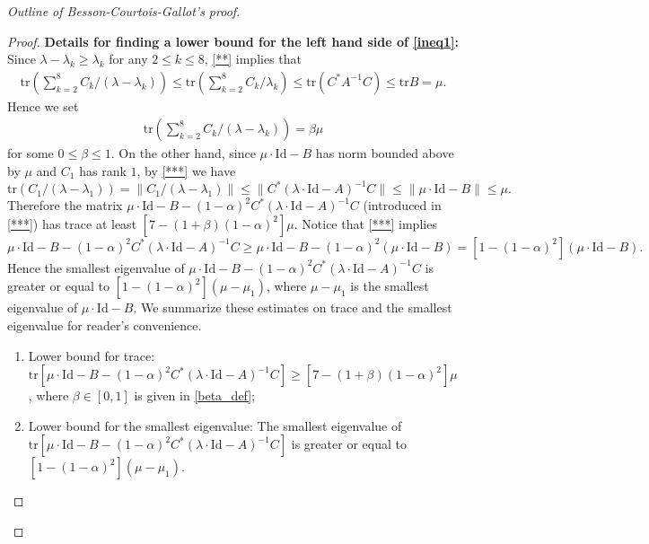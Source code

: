 \documentclass{article}
\newcommand{\id}{\mathrm{Id}}
\newcommand{\tr}{\mathrm{tr}}
\theoremstyle{definition}
\begin{document}
\begin{proof}[Outline of Besson-Courtois-Gallot's proof]
\begin{proof}
\textbf{Details for finding a lower bound for the left hand side of \eqref{ineq1}:} Since $\lambda-\lambda_k\geq\lambda_k$ for any $2\leq k\leq 8$, \eqref{**} implies that 
\begin{align}\label{case2_trace_ineq}
\tr\left(\sum_{k=2}^8C_k/(\lambda-\lambda_k)\right)\leq \tr\left(\sum_{k=2}^8C_k/\lambda_k\right)\leq \tr(C^*A^{-1}C)\leq \tr B=\mu.
\end{align}
Hence we set 
\begin{align}\label{beta_def}
\tr\left(\sum_{k=2}^8C_k/(\lambda-\lambda_k)\right)=\beta\mu
\end{align}
for some $0\leq\beta\leq 1$. On the other hand, since $\mu\cdot\id-B$ has norm bounded above by $\mu$ and $C_1$ has rank $1$, by \eqref{***} we have
$$\tr(C_1/(\lambda-\lambda_1))=\|C_1/(\lambda-\lambda_1)\|\leq\|C^*(\lambda\cdot\id-A)^{-1}C\|\leq\|\mu\cdot\id-B\|\leq \mu.$$
Therefore the matrix $\mu\cdot\id-B-(1-\alpha)^2C^*(\lambda\cdot\id-A)^{-1}C$ (introduced in \eqref{***}) has trace at least $[7-(1+\beta)(1-\alpha)^2]\mu$.
Notice that \eqref{***} implies
$$\mu\cdot\id-B-(1-\alpha)^2C^*(\lambda\cdot\id-A)^{-1}C\geq\mu\cdot\id-B-(1-\alpha)^2(\mu\cdot\id-B)=[1-(1-\alpha)^2](\mu\cdot\id-B).$$
Hence the smallest eigenvalue of $\mu\cdot\id-B-(1-\alpha)^2C^*(\lambda\cdot\id-A)^{-1}C$ is greater or equal to $[1-(1-\alpha)^2](\mu-\mu_1)$, where $\mu-\mu_1$ is the smallest eigenvalue of $\mu\cdot\id-B$.  We summarize these estimates on trace and the smallest eigenvalue for reader's convenience.
\begin{enumerate}
\item[\hypertarget{E1}{(E1)}.] Lower bound for trace: $\tr[\mu\cdot\id-B-(1-\alpha)^2C^*(\lambda\cdot\id-A)^{-1}C]\geq[7-(1+\beta)(1-\alpha)^2]\mu$, where $\beta\in[0,1]$ is given in \eqref{beta_def};
\item[\hypertarget{E2}{(E2)}.] Lower bound for the smallest eigenvalue: The smallest eigenvalue of $\tr[\mu\cdot\id-B-(1-\alpha)^2C^*(\lambda\cdot\id-A)^{-1}C]$ is greater or equal to $[1-(1-\alpha)^2](\mu-\mu_1)$.
\end{enumerate}


\end{proof}
\end{proof}
\end{document}
